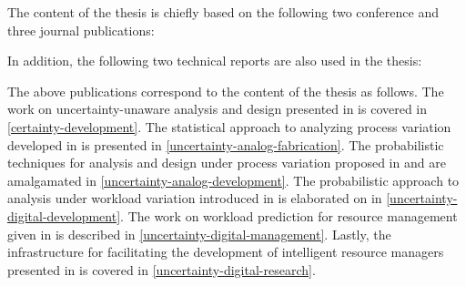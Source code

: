The content of the thesis is chiefly based on the following two conference and
three journal publications:

\printbibliography[heading=none,keyword=own]

In addition, the following two technical reports are also used in the thesis:

\printbibliography[heading=none,keyword=own-unpublished]

The above publications correspond to the content of the thesis as follows. The
work on uncertainty-unaware analysis and design presented in \cite{ukhov2012} is
covered in \cref{certainty-development}. The statistical approach to analyzing
process variation developed in \cite{ukhov2014a} is presented in
\cref{uncertainty-analog-fabrication}. The probabilistic techniques for analysis
and design under process variation proposed in \cite{ukhov2014b} and
\cite{ukhov2015} are amalgamated in \cref{uncertainty-analog-development}. The
probabilistic approach to analysis under workload variation introduced in
\cite{ukhov2017a} is elaborated on in \cref{uncertainty-digital-development}.
The work on workload prediction for resource management given in
\cite{ukhov2017b} is described in \cref{uncertainty-digital-management}. Lastly,
the infrastructure for facilitating the development of intelligent resource
managers presented in \cite{ukhov2017c} is covered in
\cref{uncertainty-digital-research}.
